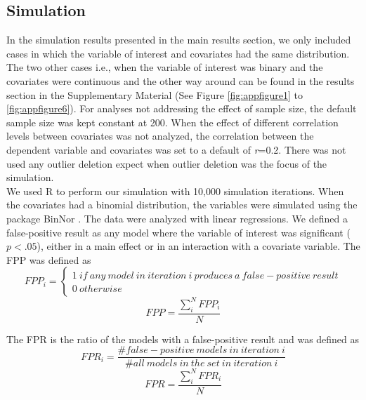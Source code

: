 \subsection{Simulation}
In the simulation results presented in the main results section, we only included cases in which the variable of interest and covariates had the same distribution. The two other cases i.e., when the variable of interest was binary and the covariates were continuous and the other way around can be found in the results section in the Supplementary Material (See Figure \ref{fig:appfigure1} to \ref{fig:appfigure6}). For analyses not addressing the effect of sample size, the default sample size was kept constant at 200. When the effect of different correlation levels between covariates was not analyzed, the correlation between the dependent variable and covariates was set to a default of \textit{r}=0.2. There was not used any outlier deletion expect when outlier deletion was the focus of the simulation.\\
We used R \citep{Team2018} to perform our simulation with 10,000 simulation iterations. When the covariates had a binomial distribution, the variables were simulated using the package BinNor \citep{Demirtas2014}. The data were analyzed with linear regressions. We defined a false-positive result as any model where the variable of interest was significant ($p < .05$), either in a main effect or in an interaction with a covariate variable. The FPP was defined as \\

\[FPP_i=\left. \left\{\begin{array}{c}
1\ if\ any\ model\ in\ iteration\ i\ produces\ a\ false-positive\ result \\ 
0\ otherwise\  \end{array}
\right.\] 
\[FPP=\frac{\sum_{i}^{N}{FPP_i}}{N}\] 

The FPR is the ratio of the models with a false-positive result and was defined as \\

\[FPR_i=\frac{\#false-positive\ models\ in\ iteration\ i}{\#all\ models\ in\ the\ set\ in\ iteration\ i}\] 
\[FPR=\frac{\sum_{i}^{N}{FPR_i}}{N}\] 



